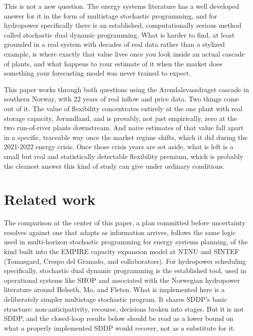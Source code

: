 \documentclass[11pt]{article}
\begin{document}
This is not a new question. The energy systems literature has a well developed answer for it in the form of multistage stochastic programming, and for hydropower specifically there is an established, computationally serious method called stochastic dual dynamic programming. What is harder to find, at least grounded in a real system with decades of real data rather than a stylized example, is where exactly that value lives once you look inside an actual cascade of plants, and what happens to your estimate of it when the market does something your forecasting model was never trained to expect.

This paper works through both questions using the Arendalsvassdraget cascade in southern Norway, with 22 years of real inflow and price data. Two things come out of it. The value of flexibility concentrates entirely at the one plant with real storage capacity, Jorundland, and is provably, not just empirically, zero at the two run-of-river plants downstream. And naive estimates of that value fall apart in a specific, traceable way once the market regime shifts, which it did during the 2021-2022 energy crisis. Once those crisis years are set aside, what is left is a small but real and statistically detectable flexibility premium, which is probably the cleanest answer this kind of study can give under ordinary conditions.

\section{Related work}

The comparison at the center of this paper, a plan committed before uncertainty resolves against one that adapts as information arrives, follows the same logic used in multi-horizon stochastic programming for energy systems planning, of the kind built into the EMPIRE capacity expansion model at NTNU and SINTEF (Tomasgard, Crespo del Granado, and collaborators). For hydropower scheduling specifically, stochastic dual dynamic programming is the established tool, used in operational systems like SHOP and associated with the Norwegian hydropower literature around Helseth, Mo, and Fleten. What is implemented here is a deliberately simpler multistage stochastic program. It shares SDDP's basic structure: non-anticipativity, recourse, decisions broken into stages. But it is not SDDP, and the closed-loop results below should be read as a lower bound on what a properly implemented SDDP would recover, not as a substitute for it.
\end{document}
